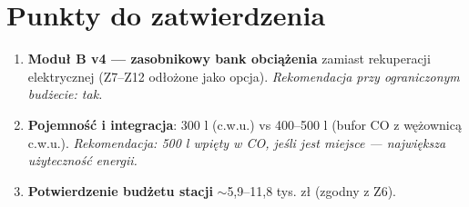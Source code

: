 \documentclass[11pt,a4paper]{article}
\begin{document}
\section{Punkty do zatwierdzenia}
\begin{enumerate}[label=\textbf{Z\arabic*.},start=13]
\item \textbf{Moduł B v4 --- zasobnikowy bank obciążenia} zamiast rekuperacji elektrycznej
(Z7--Z12 odłożone jako opcja). \emph{Rekomendacja przy ograniczonym budżecie: tak.}
\item \textbf{Pojemność i integracja}: 300 l (c.w.u.) vs 400--500 l (bufor CO z wężownicą c.w.u.).
\emph{Rekomendacja: 500 l wpięty w CO, jeśli jest miejsce --- największa użyteczność energii.}
\item \textbf{Potwierdzenie budżetu stacji} $\sim$5,9--11,8 tys. zł (zgodny z Z6).
\end{enumerate}
\end{document}
